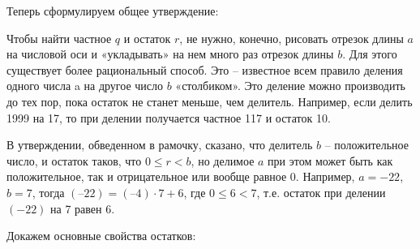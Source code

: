 Теперь сформулируем общее утверждение:


Чтобы найти частное $q$ и остаток $r$, не нужно, конечно, рисовать отрезок длины $a$ на числовой оси и «укладывать» на нем много раз отрезок длины $b$. Для этого существует более рациональный способ. Это – известное всем правило деления одного числа a на другое число $b$ «столбиком». Это деление можно производить до тех пор, пока остаток не станет меньше, чем делитель. Например, если делить 1999 на 17, то при делении получается частное 117 и остаток 10.

\begin{prim}
В утверждении, обведенном в рамочку, сказано, что делитель $b$ – положительное число, и остаток таков, что $0  \leqslant r < b$, но делимое $a$ при этом может быть как положительное, так и отрицательное или вообще равное $0$. Например, $a = -22$, $b = 7$, тогда   $(–22) = (–4)\cdot 7 + 6$, где $0 \leqslant 6 <7$, т.е. остаток при делении $(-22)$ на 7 равен 6.
\end{prim}


\newpage
Докажем основные свойства остатков:


